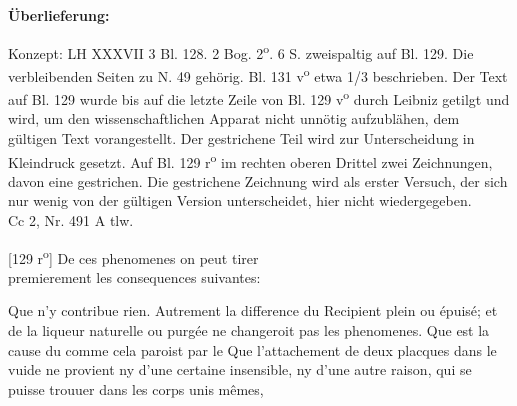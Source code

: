       
               
                \begin{ledgroupsized}[r]{120mm}
                \footnotesize 
                \pstart                
                \noindent\textbf{\"{U}berlieferung:}   
                \pend
                \end{ledgroupsized}
            
              
                            \begin{ledgroupsized}[r]{114mm}
                            \footnotesize 
                            \pstart \parindent -6mm
                            Konzept: LH XXXVII 3 Bl. 128. 2 Bog. 2\textsuperscript{o}. 6 S. zweispaltig auf Bl. 129. Die verbleibenden Seiten zu N. 49\raisebox{-0.5ex}{\notsotiny 5} geh\"{o}rig. Bl. 131 v\textsuperscript{o} etwa 1/3 beschrieben. Der Text auf Bl. 129 wurde bis auf die letzte Zeile von Bl. 129 v\textsuperscript{o} durch Leibniz getilgt und wird, um den wissenschaftlichen Apparat nicht unn\"{o}tig aufzubl\"{a}hen, dem g\"{u}ltigen Text vorangestellt. Der gestrichene Teil wird zur Unterscheidung in Kleindruck gesetzt. Auf Bl. 129 r\textsuperscript{o} im rechten oberen Drittel zwei Zeichnungen, davon eine gestrichen. Die gestrichene Zeichnung wird als erster Versuch, der sich nur wenig von der g\"{u}ltigen Version unterscheidet, hier nicht wiedergegeben.\\Cc 2, Nr. 491 A tlw. \pend
                            \end{ledgroupsized}
                \vspace*{8mm}
                \pstart 
                \footnotesize
            \begin{center}[129 r\textsuperscript{o}] De ces phenomenes on peut tirer\\premierement les consequences suivantes:\end{center}
          \pend \pstart\rule[0cm]{0pt}{15pt}\footnotesize {} Que \protect{}n'y contribue rien. Autrement la difference du Recipient plein ou \'{e}puis\'{e}; et de la liqueur\protect{} naturelle ou purg\'{e}e ne changeroit pas les phenomenes.\pend \pstart \footnotesize{} Que  est la cause du  comme cela paroist par le \pend \pstart \footnotesize{} Que l'attachement de deux placques dans le vuide\protect{} ne provient ny d'une certaine  insensible, ny d'une autre raison,  qui se puisse trouuer dans les corps\protect{} unis mêmes,  
